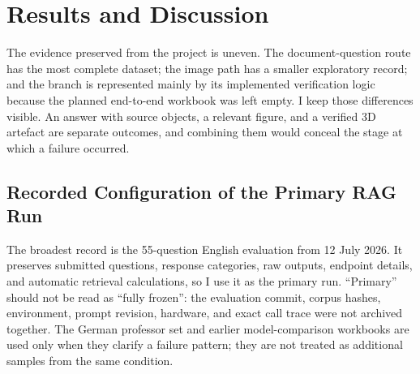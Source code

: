 \chapter{Results and Discussion}
\label{chap:results}

The evidence preserved from the project is uneven. The document-question route has the most complete dataset; the image path has a smaller exploratory record; and the \MCP{} branch is represented mainly by its implemented verification logic because the planned end-to-end workbook was left empty. I keep those differences visible. An answer with source objects, a relevant figure, and a verified 3D artefact are separate outcomes, and combining them would conceal the stage at which a failure occurred.

\section{Recorded Configuration of the Primary RAG Run}
\label{sec:results-configuration}

The broadest record is the 55-question English evaluation from 12 July 2026. It preserves submitted questions, response categories, raw outputs, endpoint details, and automatic retrieval calculations, so I use it as the primary run. ``Primary'' should not be read as ``fully frozen'': the evaluation commit, corpus hashes, environment, prompt revision, hardware, and exact call trace were not archived together. The German professor set and earlier model-comparison workbooks are used only when they clarify a failure pattern; they are not treated as additional samples from the same condition.

